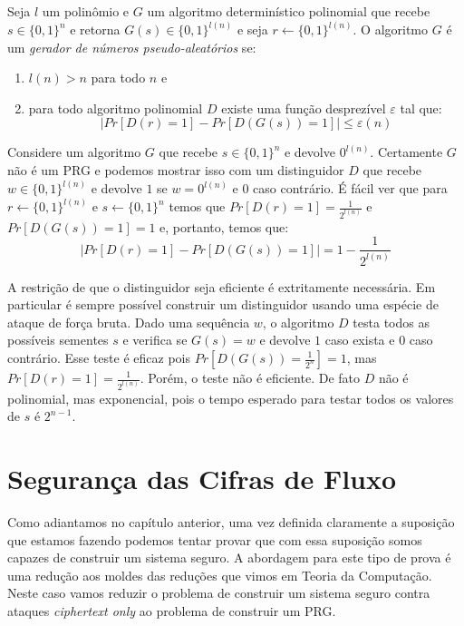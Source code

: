 \begin{definition}
  Seja $l$ um polinômio e $G$ um algoritmo determinístico polinomial que recebe $s \in \{0,1\}^n$ e retorna $G(s) \in \{0,1\}^{l(n)}$ e seja $r \leftarrow \{0,1\}^{l(n)}$.
  O algoritmo $G$ é um {\em gerador de números pseudo-aleatórios} se:
\begin{enumerate}
\item $l(n) > n$ para todo $n$ e
\item para todo algoritmo polinomial $D$ existe uma função desprezível $\varepsilon$ tal que:
\begin{displaymath}
  |Pr[D(r) = 1] - Pr[D(G(s)) = 1]| \leq \varepsilon(n)  
\end{displaymath}
\end{enumerate}
\end{definition}


\begin{example}
  Considere um algoritmo $G$ que recebe $s \in \{0,1\}^n$ e devolve $0^{l(n)}$.
  Certamente $G$ não é um PRG e podemos mostrar isso com um distinguidor $D$ que recebe $w \in \{0,1\}^{l(n)}$ e devolve $1$ se $w = 0^{l(n)}$ e $0$ caso contrário.
  É fácil ver que para $r \leftarrow \{0,1\}^{l(n)}$ e $s \leftarrow \{0,1\}^n$ temos que $Pr[D(r) = 1] = \frac{1}{2^{l(n)}}$ e $Pr[D(G(s)) = 1] = 1$ e, portanto, temos que:
\begin{displaymath}
  |Pr[D(r) = 1] - Pr[D(G(s)) = 1]| = 1 - \frac{1}{2^{l(n)}}
\end{displaymath}

\end{example}


A restrição de que o distinguidor seja eficiente é extritamente necessária.
Em particular é sempre possível construir um distinguidor usando uma espécie de ataque de força bruta.
Dado uma sequência $w$, o algoritmo $D$ testa todos as possíveis sementes $s$ e verifica se $G(s) = w$ e devolve $1$ caso exista e $0$ caso contrário.
Esse teste é eficaz pois $Pr[D(G(s)) = \frac{1}{2^n}] = 1$, mas $Pr[D(r) = 1] = \frac{1}{2^{l(n)}}$.
Porém, o teste não é eficiente.
De fato $D$ não é polinomial, mas exponencial, pois o tempo esperado para testar todos os valores de $s$ é $2^{n-1}$. 

\section{Segurança das Cifras de Fluxo}
\label{sec:streamcipher-sec}

Como adiantamos no capítulo anterior, uma vez definida claramente a suposição que estamos fazendo podemos tentar provar que com essa suposição somos capazes de construir um sistema seguro.
A abordagem para este tipo de prova é uma redução aos moldes das reduções que vimos em Teoria da Computação.
Neste caso vamos reduzir o problema de construir um sistema seguro contra ataques {\em ciphertext only} ao problema de construir um PRG.


